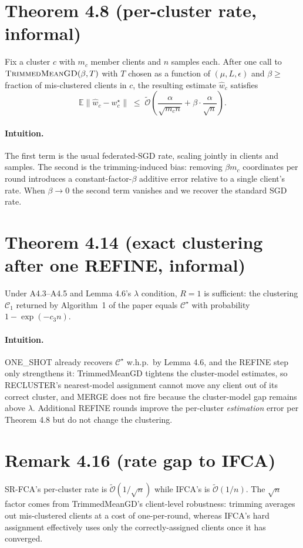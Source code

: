 \section*{Theorem 4.8 (per-cluster rate, informal)}

Fix a cluster $c$ with $m_c$ member clients and $n$ samples each. After one call to $\textsc{TrimmedMeanGD}(\beta, T)$ with $T$ chosen as a function of $(\mu, L, \epsilon)$ and $\beta \ge $ fraction of mis-clustered clients in $c$, the resulting estimate $\hat{w}_c$ satisfies
\[
    \mathbb{E}\lVert \hat{w}_c - w_c^\star \rVert \;\le\; \tilde{\mathcal{O}}\!\left(\frac{\alpha}{\sqrt{m_c n}} + \beta \cdot \frac{\alpha}{\sqrt{n}}\right).
\]

\paragraph{Intuition.} The first term is the usual federated-SGD rate, scaling jointly in clients and samples. The second is the trimming-induced bias: removing $\beta m_c$ coordinates per round introduces a constant-factor-$\beta$ additive error relative to a single client's rate. When $\beta \to 0$ the second term vanishes and we recover the standard SGD rate.

\section*{Theorem 4.14 (exact clustering after one REFINE, informal)}

Under A4.3--A4.5 and Lemma 4.6's $\lambda$ condition, $R = 1$ is sufficient: the clustering $\mathcal{C}_1$ returned by Algorithm~1 of the paper equals $\mathcal{C}^\star$ with probability $1 - \exp(-c_3 n)$.

\paragraph{Intuition.} ONE\_SHOT already recovers $\mathcal{C}^\star$ w.h.p.\ by Lemma 4.6, and the REFINE step only strengthens it: TrimmedMeanGD tightens the cluster-model estimates, so RECLUSTER's nearest-model assignment cannot move any client out of its correct cluster, and MERGE does not fire because the cluster-model gap remains above $\lambda$. Additional REFINE rounds improve the per-cluster \emph{estimation} error per Theorem 4.8 but do not change the clustering.

\section*{Remark 4.16 (rate gap to IFCA)}

SR-FCA's per-cluster rate is $\tilde{\mathcal{O}}(1/\sqrt{n})$ while IFCA's is $\tilde{\mathcal{O}}(1/n)$. The $\sqrt{n}$ factor comes from TrimmedMeanGD's client-level robustness: trimming averages out mis-clustered clients at a cost of one-per-round, whereas IFCA's hard assignment effectively uses only the correctly-assigned clients once it has converged.
